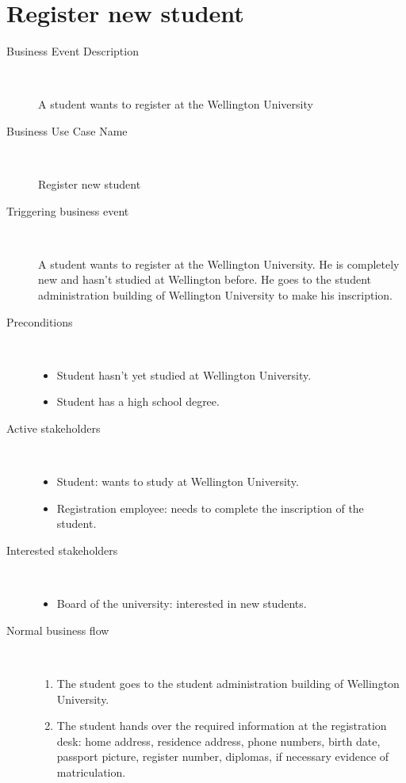 \section{Register new student}
\label{register-new-student}

\begin{description}
	\item[Business Event Description] \
	\par A student wants to register at the Wellington
	University
	\item[Business Use Case Name] \
	\par Register new student
	\item[Triggering business event] \
	\par A student wants to register at the Wellington
	University. He is completely new and hasn't studied at Wellington before. He
	goes to the student administration building of Wellington University to make
	his inscription.
	\item[Preconditions] \ 
	\begin{itemize}
		\item Student hasn't yet studied at Wellington University.
		\item Student has a high school degree.
	\end{itemize}
	\item[Active stakeholders] \ 
	\begin{itemize}
	  	\item Student: wants to study at Wellington University.
		\item Registration employee: needs to complete the inscription of the student.
	\end{itemize}
	\item[Interested stakeholders] \ 
		\begin{itemize}
		  \item Board of the university: interested in new students.
		\end{itemize}
	\item[Normal business flow] \
	\begin{enumerate}
	  	\item The student goes to the student administration building of Wellington
	  	University.
	  	\item The student hands over the required information at the registration
	  	desk: home address, residence address, phone numbers, birth date, passport
	  	picture, register number, diplomas, if necessary evidence of matriculation.

\end{enumerate}
\end{description}
